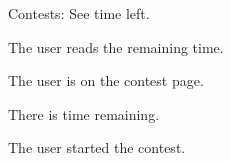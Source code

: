 \documentclass[10pt,a4paper]{article}
\begin{document}
\begin{uc}{Contests: See time left.}


    \begin{uc-mss}
    \item The user reads the remaining time. 
    \end{uc-mss}

    \begin{uc-pre}
    \item The user is on the contest page.
    \item There is time remaining. 
    \end{uc-pre}

    \begin{uc-trig}
    The user started the contest. 
    \end{uc-trig}

\end{uc}
\end{document}
